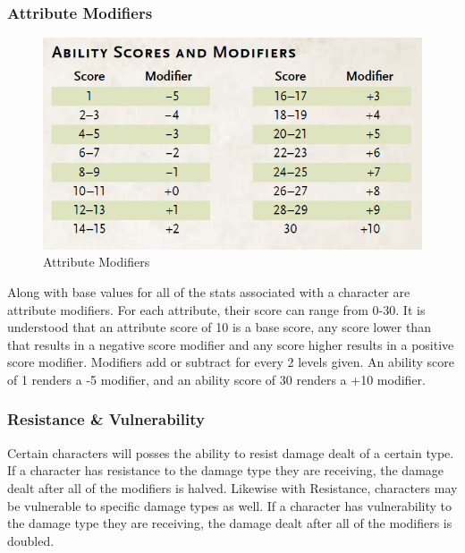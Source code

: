 \documentclass[12pt,a4paper]{report}
\begin{document}
		\subsubsection{Attribute Modifiers}
			\begin{figure}
				\includegraphics[scale=0.3]{modifier}
				\caption{Attribute Modifiers}
				\label{fig: Attribute Modifiers}
			\end{figure}
			Along with base values for all of the stats associated with a character are attribute modifiers. For each attribute, their score can range from 0-30. It is understood that an attribute score of 10 is a base score, any score lower than that results in a negative score modifier and any score higher results in a positive score modifier. Modifiers add or subtract for every 2 levels given. An ability score of 1 renders a -5 modifier, and an ability score of 30 renders a +10 modifier.
		\subsubsection{Resistance \& Vulnerability}
			Certain characters will posses the ability to resist damage dealt of a certain type. If a character has resistance to the damage type they are receiving, the damage dealt after all of the modifiers is halved. Likewise with Resistance, characters may be vulnerable to specific damage types as well. If a character has vulnerability to the damage type they are receiving, the damage dealt after all of the modifiers is doubled.
\end{document}
